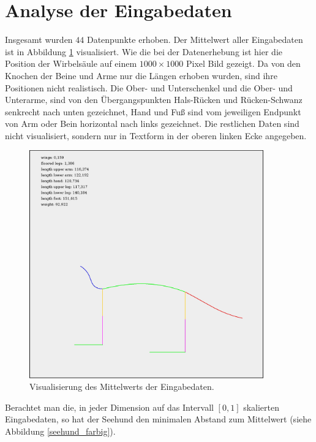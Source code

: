  \section{Analyse der Eingabedaten}
 \label{pca_input_analysis}
 
 Insgesamt wurden $44$ Datenpunkte erhoben.  Der Mittelwert aller Eingabedaten ist in Abbildung \ref{mean_log_weight} visualisiert. Wie die bei der Datenerhebung ist hier die Position der Wirbelsäule auf einem $1000 \times 1000$ Pixel Bild gezeigt. Da von den Knochen der Beine und Arme nur die Längen erhoben wurden, sind ihre Positionen nicht realistisch. Die Ober- und Unterschenkel und die Ober- und Unterarme, sind von den Übergangspunkten Hals-Rücken und Rücken-Schwanz senkrecht nach unten gezeichnet, Hand und Fuß sind vom jeweiligen Endpunkt von Arm oder Bein horizontal nach links gezeichnet. Die restlichen Daten sind nicht visualisiert, sondern nur in Textform in der oberen linken Ecke angegeben.
 
 \begin{figure}
  \centering
  \includegraphics[width=0.9\textwidth]{../PCA/mean_log_weight.jpg}
  \caption{Visualisierung des Mittelwerts der Eingabedaten.}
  \label{mean_log_weight}
 \end{figure}
 
 Berachtet man die, in jeder Dimension auf das Intervall $[0, 1]$ skalierten Eingabedaten, so hat der Seehund den minimalen Abstand zum Mittelwert (siehe Abbildung \ref{seehund_farbig}).
 
